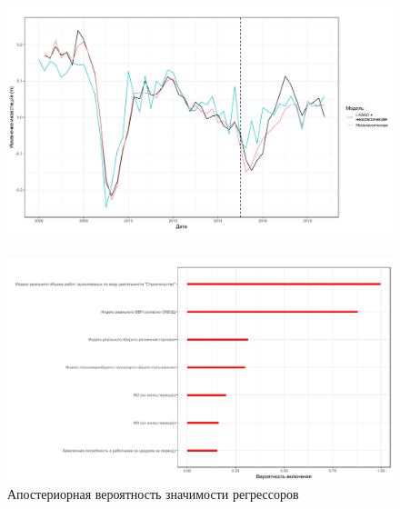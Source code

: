 \documentclass[c, dvipsnames]{beamer}  %
\begin{document}
 \begin{frame}
\frametitle{\insertsection} 
\framesubtitle{\insertsubsection}
\begin{figure}
\includegraphics[width=\linewidth]{lnc_plot.pdf}
\end{figure}
\end{frame} 

\begin{frame}
\frametitle{\insertsection} 
\framesubtitle{\insertsubsection} 
\begin{figure}
\caption{Апостериорная вероятность значимости регрессоров}
\includegraphics[width=\linewidth]{nzlollipop.pdf}
\end{figure}
\end{frame} 
\end{document}
